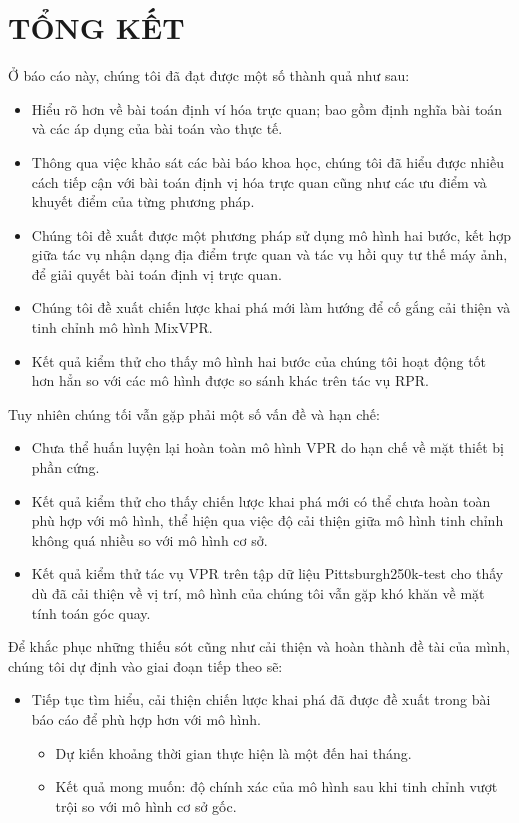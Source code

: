 \chapter{TỔNG KẾT}

Ở báo cáo này, chúng tôi đã đạt được một số thành quả như sau:
\begin{itemize}
	\item Hiểu rõ hơn về bài toán định ví hóa trực quan; bao gồm định nghĩa bài toán và các áp dụng của bài toán vào thực tế.
	\item Thông qua việc khảo sát các bài báo khoa học, chúng tôi đã hiểu được nhiều cách tiếp cận với bài toán định vị hóa trực quan cũng như các ưu điểm và khuyết điểm của từng phương pháp.
	\item Chúng tôi đề xuất được một phương pháp sử dụng mô hình hai bước, kết hợp giữa tác vụ nhận dạng địa điểm trực quan và tác vụ hồi quy tư thế máy ảnh, để giải quyết bài toán định vị trực quan.
	\item Chúng tôi đề xuất chiến lược khai phá mới làm hướng để cố gắng cải thiện và tinh chỉnh mô hình MixVPR.
	\item Kết quả kiểm thử cho thấy mô hình hai bước của chúng tôi hoạt động tốt hơn hẳn so với các mô hình được so sánh khác trên tác vụ RPR.
\end{itemize}

Tuy nhiên chúng tối vẫn gặp phải một số vấn đề và hạn chế:
\begin{itemize}
	\item Chưa thể huấn luyện lại hoàn toàn mô hình VPR do hạn chế về mặt thiết bị phần cứng.
	\item Kết quả kiểm thử cho thấy chiến lược khai phá mới có thể chưa hoàn toàn phù hợp với mô hình, thể hiện qua việc độ cải thiện giữa mô hình tinh chỉnh không quá nhiều so với mô hình cơ sở.
	\item Kết quả kiểm thử tác vụ VPR trên tập dữ liệu Pittsburgh250k-test cho thấy dù đã cải thiện về vị trí, mô hình của chúng tôi vẫn gặp khó khăn về mặt tính toán góc quay.
\end{itemize}

Để khắc phục những thiếu sót cũng như cải thiện và hoàn thành đề tài của mình, chúng tôi dự định vào giai đoạn tiếp theo sẽ:
\begin{itemize}
	\item Tiếp tục tìm hiểu, cải thiện chiến lược khai phá đã được đề xuất trong bài báo cáo để phù hợp hơn với mô hình.
	      \begin{itemize}
		      \item Dự kiến khoảng thời gian thực hiện là một đến hai tháng.
		      \item Kết quả mong muốn: độ chính xác của mô hình sau khi tinh chỉnh vượt trội so với mô hình cơ sở gốc.
	      \end{itemize}
\end{itemize}
